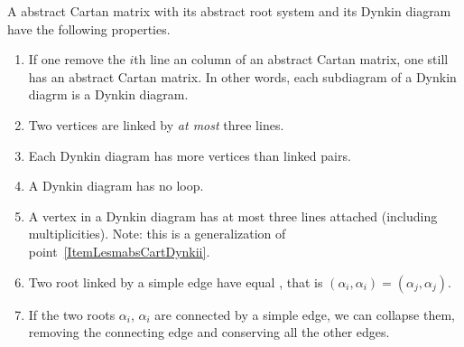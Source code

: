 \begin{lemma}   \label{LesmabsCartDynk}
    A abstract Cartan matrix with its abstract root system and its Dynkin diagram have the following properties.
    \begin{enumerate}
        \item\label{ItemLesmabsCartDynki}
            If one remove the \( i\)th line an column of an abstract Cartan matrix, one still has an abstract Cartan matrix. In other words, each subdiagram of a Dynkin diagrm is a Dynkin diagram.
        \item\label{ItemLesmabsCartDynkii}
            Two vertices are linked by \emph{at most} three lines.
        \item\label{ItemLesmabsCartDynkiii}
            Each Dynkin diagram has more vertices than linked pairs.
        \item\label{ItemLesmabsCartDynkiv}
            A Dynkin diagram has no loop.
        \item\label{ItemLesmabsCartDynkv}
            A vertex in a Dynkin diagram has at most three lines attached (including multiplicities). Note: this is a generalization of point~\ref{ItemLesmabsCartDynkii}.
        \item\label{ItemLesmabsCartDynkvi}
            Two root linked by a simple edge have equal , that is \( (\alpha_i,\alpha_i)=(\alpha_j,\alpha_j)\).
        \item\label{ItemLesmabsCartDynkvii}
            If the two roots \( \alpha_i\), \( \alpha_i\) are connected by a simple edge, we can collapse them, removing the connecting edge and conserving all the other edges.

    \end{enumerate}
\end{lemma}

